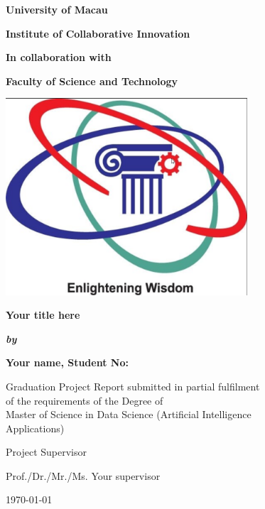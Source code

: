 \documentclass[12pt,,a4paper]{article}
\begin{document}
\onecolumn

\begin{center}
\textbf{\fontsize{14}{\baselineskip}\selectfont University of Macau}

\bigskip

\textbf{\fontsize{14}{\baselineskip}\selectfont Institute of Collaborative Innovation}

\bigskip

\textbf{\fontsize{14}{\baselineskip}\selectfont In collaboration with }

\bigskip

\textbf{\fontsize{14}{\baselineskip}\selectfont Faculty of Science and Technology}

\bigskip

\includegraphics[width=9cm]{logo-2.png}

\bigskip

\textbf{\fontsize{20}{\baselineskip}\selectfont Your title here}

\bigskip

\bigskip

\bigskip

\textit{\textbf{\fontsize{14}{\baselineskip}\selectfont by}}

\bigskip

\bigskip

\bigskip

\textbf{\fontsize{14}{\baselineskip}\selectfont Your name, Student No: }

\bigskip

\bigskip

\bigskip

Graduation Project Report submitted in partial fulfilment\\
of the requirements of the Degree of \\
Master of Science in Data Science (Artificial Intelligence\\Applications)\\

\bigskip

Project Supervisor

\bigskip

Prof./Dr./Mr./Ms. Your supervisor

\bigskip

\bigskip

{\today}
\end{center}
\end{document}
